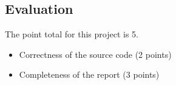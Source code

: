 \subsection*{Evaluation}

The point total for this project is 5.

\begin{itemize}
\item Correctness of the source code (2 points)
\item	Completeness of the report (3 points)
\end{itemize}

